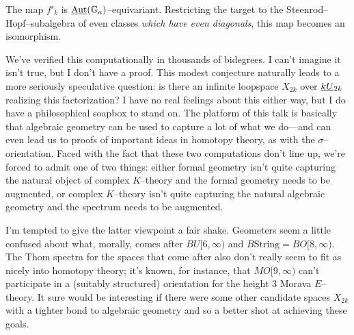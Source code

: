 \begin{conjecture}
The map $f'_k$ is $\underline{\operatorname{Aut}}(\mathbb G_a)$--equivariant.  Restricting the target to the Steenrod--Hopf--subalgebra of even classes \emph{which have even diagonals}, this map becomes an isomorphism.
\end{conjecture}

\noindent We've verified this computationally in thousands of bidegrees.  I can't imagine it isn't true, but I don't have a proof.  This modest conjecture naturally leads to a more seriously speculative question: is there an infinite loopspace $X_{2k}$ over $\smash{\underline{kU}}_{2k}$ realizing this factorization?  I have no real feelings about this either way, but I do have a philosophical soapbox to stand on.  The platform of this talk is basically that algebraic geometry can be used to capture a lot of what we do---and can even lead us to proofs of important ideas in homotopy theory, as with the $\sigma$--orientation.  Faced with the fact that these two computations don't line up, we're forced to admit one of two things: either formal geometry isn't quite capturing the natural object of complex $K$--theory and the formal geometry needs to be augmented, or complex $K$--theory isn't quite capturing the natural algebraic geometry and the spectrum needs to be augmented.

I'm tempted to give the latter viewpoint a fair shake.  Geometers seem a little confused about what, morally, comes after $BU[6, \infty)$ and $B\mathrm{String} = BO[8, \infty)$.  The Thom spectra for the spaces that come after also don't really seem to fit as nicely into homotopy theory; it's known, for instance, that $MO[9, \infty)$ can't participate in a (suitably structured) orientation for the height $3$ Morava $E$--theory.  It sure would be interesting if there were some other candidate spaces $X_{2k}$ with a tighter bond to algebraic geometry and so a better shot at achieving these goals.

